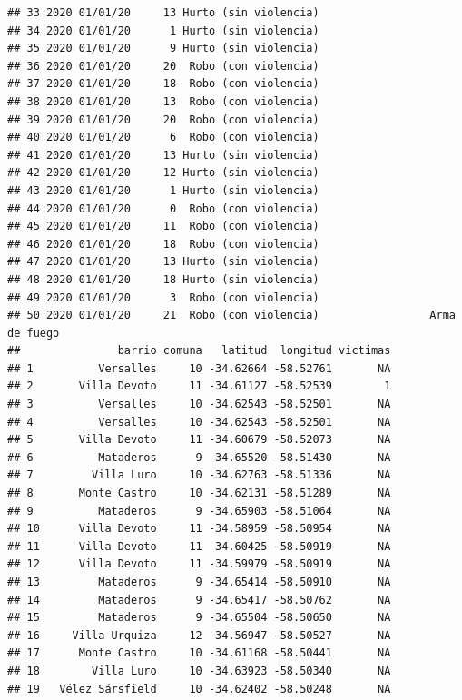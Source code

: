 \documentclass[
]{book}
\begin{document}
\begin{verbatim}
## 33 2020 01/01/20     13 Hurto (sin violencia)                              
## 34 2020 01/01/20      1 Hurto (sin violencia)                              
## 35 2020 01/01/20      9 Hurto (sin violencia)                              
## 36 2020 01/01/20     20  Robo (con violencia)                              
## 37 2020 01/01/20     18  Robo (con violencia)                              
## 38 2020 01/01/20     13  Robo (con violencia)                              
## 39 2020 01/01/20     20  Robo (con violencia)                              
## 40 2020 01/01/20      6  Robo (con violencia)                              
## 41 2020 01/01/20     13 Hurto (sin violencia)                              
## 42 2020 01/01/20     12 Hurto (sin violencia)                              
## 43 2020 01/01/20      1 Hurto (sin violencia)                              
## 44 2020 01/01/20      0  Robo (con violencia)                              
## 45 2020 01/01/20     11  Robo (con violencia)                              
## 46 2020 01/01/20     18  Robo (con violencia)                              
## 47 2020 01/01/20     13 Hurto (sin violencia)                              
## 48 2020 01/01/20     18 Hurto (sin violencia)                              
## 49 2020 01/01/20      3  Robo (con violencia)                              
## 50 2020 01/01/20     21  Robo (con violencia)                 Arma de fuego
##               barrio comuna   latitud  longitud victimas
## 1          Versalles     10 -34.62664 -58.52761       NA
## 2       Villa Devoto     11 -34.61127 -58.52539        1
## 3          Versalles     10 -34.62543 -58.52501       NA
## 4          Versalles     10 -34.62543 -58.52501       NA
## 5       Villa Devoto     11 -34.60679 -58.52073       NA
## 6          Mataderos      9 -34.65520 -58.51430       NA
## 7         Villa Luro     10 -34.62763 -58.51336       NA
## 8       Monte Castro     10 -34.62131 -58.51289       NA
## 9          Mataderos      9 -34.65903 -58.51064       NA
## 10      Villa Devoto     11 -34.58959 -58.50954       NA
## 11      Villa Devoto     11 -34.60425 -58.50919       NA
## 12      Villa Devoto     11 -34.59979 -58.50919       NA
## 13         Mataderos      9 -34.65414 -58.50910       NA
## 14         Mataderos      9 -34.65417 -58.50762       NA
## 15         Mataderos      9 -34.65504 -58.50650       NA
## 16     Villa Urquiza     12 -34.56947 -58.50527       NA
## 17      Monte Castro     10 -34.61168 -58.50441       NA
## 18        Villa Luro     10 -34.63923 -58.50340       NA
## 19   Vélez Sársfield     10 -34.62402 -58.50248       NA

\end{verbatim}
\end{document}
